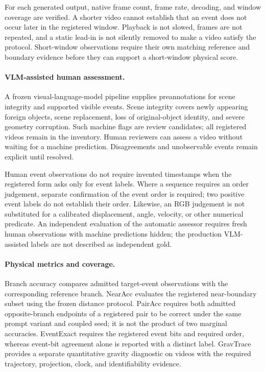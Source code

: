 For each generated output, native frame count, frame rate, decoding, and
window coverage are verified. A shorter video cannot establish that an event
does not occur later in the registered window. Playback is not slowed, frames
are not repeated, and a static lead-in is not silently removed to make a
video satisfy the protocol. Short-window observations require their own
matching reference and boundary evidence before they can support a
short-window physical score.

\paragraph{VLM-assisted human assessment.}
A frozen visual-language-model pipeline supplies preannotations for scene
integrity and supported visible events. Scene integrity covers newly
appearing foreign objects, scene replacement, loss of original-object
identity, and severe geometry corruption. Such machine flags are review
candidates; all registered videos remain in the inventory. Human reviewers
can assess a video without waiting for a machine prediction. Disagreements
and unobservable events remain explicit until resolved.

Human event observations do not require invented timestamps when the
registered form asks only for event labels. Where a sequence requires an
order judgement, separate confirmation of the event order is required;
two positive event labels do not establish their order. Likewise, an RGB
judgement is not substituted for a calibrated displacement, angle, velocity,
or other numerical predicate. An independent evaluation of the automatic
assessor requires fresh human observations with machine predictions hidden;
the production VLM-assisted labels are not described as independent gold.

\paragraph{Physical metrics and coverage.}
Branch accuracy compares admitted target-event observations with the
corresponding reference branch. NearAcc evaluates the registered near-boundary
subset using the frozen distance protocol. PairAcc requires both admitted
opposite-branch endpoints of a registered pair to be correct under the same
prompt variant and coupled seed; it is not the product of two marginal
accuracies. EventExact requires the registered event bits and required order,
whereas event-bit agreement alone is reported with a distinct label.
GravTrace provides a separate quantitative gravity diagnostic on videos with
the required trajectory, projection, clock, and identifiability evidence.

